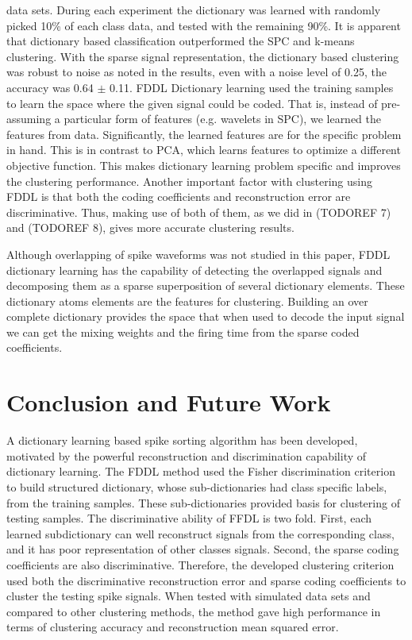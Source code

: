 \documentclass[conference]{IEEEtran}
\begin{document}
	data sets. During each experiment the dictionary was learned with randomly picked 10\% of each class data, and tested with the remaining 90\%. It is apparent that dictionary based classification outperformed the SPC and k-means clustering. With the sparse signal representation, the dictionary based clustering was robust to noise as noted in the results, even with a noise level of 0.25, the accuracy was 0.64 $\pm$ 0.11. FDDL Dictionary learning used the training samples to learn the space where the given signal could be coded. That is, instead of pre-assuming a particular form of features (e.g. wavelets in SPC), we learned the features from data. Significantly, the learned features are for the specific problem in hand. This is in contrast to PCA, which learns features to optimize a different objective function. This makes dictionary learning problem specific and improves the clustering performance. Another important factor with clustering using FDDL is that both the coding coefficients and reconstruction error are discriminative. Thus, making use of both of them, as we did in (TODOREF 7) and (TODOREF 8), gives more accurate clustering results.
	
	Although overlapping of spike waveforms was not studied in this paper, FDDL dictionary learning has the capability of detecting the overlapped signals and decomposing them as a sparse superposition of several dictionary elements. These dictionary atoms elements are the features for clustering. Building an over complete dictionary \cite{lewicki2000learning} provides the space that when used to decode the input signal we can get the mixing weights and the firing time from the sparse coded coefficients.
	
	\section{Conclusion and Future Work}
	A dictionary learning based spike sorting algorithm has been developed, motivated by the powerful reconstruction and discrimination capability of dictionary learning. The FDDL method used the Fisher discrimination criterion to build structured dictionary, whose sub-dictionaries had class specific labels, from the training samples. These sub-dictionaries provided basis for clustering of testing samples. The discriminative ability of FFDL is two fold. First, each learned subdictionary can well reconstruct signals from the corresponding class, and it has poor representation of other classes signals. Second, the sparse coding coefficients are also discriminative. Therefore, the developed clustering criterion used both the discriminative reconstruction error and sparse coding coefficients to cluster the testing spike signals. When tested with simulated data sets and compared to other clustering methods, the method gave high performance in terms of clustering accuracy and reconstruction mean squared error.
\end{document}
